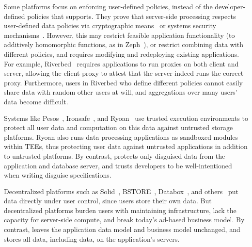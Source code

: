 Some platforms focus on enforcing user-defined policies, instead of the
developer-defined policies that \sys supports. They prove that server-side
processing respects user-defined data policies via cryptographic
means~\cite{zeph} or systems security mechanisms~\cite{riverbed}.
%
However, this may restrict feasible application functionality (\eg to additively
homomorphic functions, as in Zeph~\cite{zeph}), or restrict combining data with
different policies, and requires modifying and redeploying existing
applications.
%
For example, Riverbed~\cite{riverbed} requires applications to run proxies on
both client and server, allowing the client proxy to attest that the server
indeed runs the correct proxy. 
%
Furthermore, users in Riverbed who define different policies cannot easily share
data with random other users at will, and aggregations over many users' data
become difficult.

%
Systems like Pesos~\cite{pesos}, Ironsafe~\cite{ironsafe}, and
Ryoan~\cite{ryoan} use trusted execution environments to protect all user data
and computation on this data against untrusted storage platforms.  Ryoan also
runs data processing applications as sandboxed modules within TEEs, thus
protecting user data against untrusted applications in addition to untrusted
platforms. 
By contrast, \sys protects only disguised data from the application and database
server, and trusts
developers to be
well-intentioned when writing disguise specifications.

%

Decentralized platforms such as Solid~\cite{solid}, BSTORE~\cite{bstore},
Databox~\cite{databox}, and others~\cite{diy, amber, oort, w5, blockstack} put
data directly under user control, since users store their own data.
%
But decentralized platforms burden users with maintaining infrastructure, lack
the capacity for server-side compute, and break today's ad-based
business model.
%
By contrast, \sys leaves the application data model and business model
unchanged, and stores all data, including \xxed data, on the application's
servers.
%


